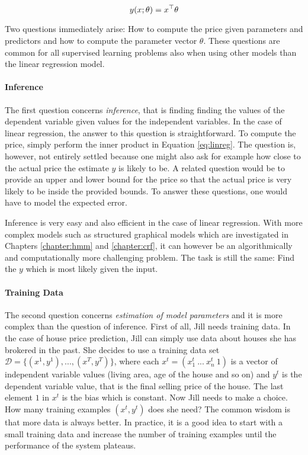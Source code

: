 \begin{equation}
y(x\mbox{$ ; \, $} \theta) = x^\top\theta\label{eq:linreg}
\end{equation}

Two questions immediately arise: How to compute the price given
parameters and predictors and how to compute the parameter vector
$\theta$. These questions are common for all supervised learning
problems also when using other models than the linear regression
model.

\paragraph{Inference} The first question concerns {\it inference},
that is finding finding the values of the dependent variable given
values for the independent variables. In the case of linear
regression, the answer to this question is straightforward. To compute
the price, simply perform the inner product in Equation
\ref{eq:linreg}. The question is, however, not entirely settled
because one might also ask for example how close to the actual price
the estimate $y$ is likely to be. A related question would be to
provide an upper and lower bound for the price so that the actual
price is very likely to be inside the provided bounds. To answer these
questions, one would have to model the expected error.

Inference is very easy and also efficient in the case of linear
regression. With more complex models such as structured graphical
models which are investigated in Chapters \ref{chapter:hmm} and
\ref{chapter:crf}, it can however be an algorithmically and
computationally more challenging problem. The task is still the
same: Find the $y$ which is most likely given the input.

\paragraph{Training Data} The second question concerns {\it estimation
  of model parameters} and it is more complex than the question of
inference. First of all, Jill needs training data.  In the case of
house price prediction, Jill can simply use data about houses she has
brokered in the past. She decides to use a training data set
$\mathcal{D} = \{(x^1, y^1), ..., (x^T, y^T)\}$, where each $x^t =
(x^t_1\ ...\ x^t_n\ 1)$ is a vector of independent variable values
(living area, age of the house and so on) and $y^t$ is the dependent
variable value, that is the final selling price of the house. The last
element $1$ in $x^t$ is the bias which is constant. Now Jill needs to
make a choice. How many training examples $(x^t, y^t)$ does she need?
The common wisdom is that more data is always better. In practice, it
is a good idea to start with a small training data and increase the
number of training examples until the performance of the system
plateaus.

